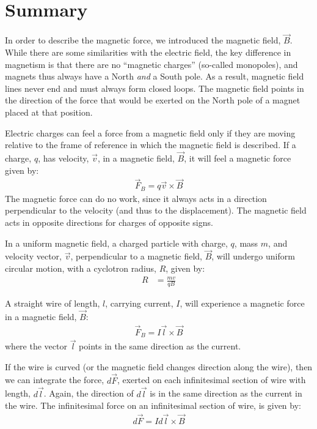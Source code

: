 \newpage
\section{Summary}
\begin{chapterSummary}
In order to describe the magnetic force, we introduced the magnetic field, $\vec B$. While there are some similarities with the electric field, the key difference in magnetism is that there are no ``magnetic charges'' (so-called monopoles), and magnets thus always have a North \textit{and} a South pole. As a result, magnetic field lines never end and must always form closed loops. The magnetic field points in the direction of the force that would be exerted on the North pole of a magnet placed at that position.

Electric charges can feel a force from a magnetic field only if they are moving relative to the frame of reference in which the magnetic field is described. If a charge, $q$, has velocity, $\vec v$, in a magnetic field, $\vec B$, it will feel a magnetic force given by:
\begin{align*}
\vec F_B =q \vec v \times \vec B
\end{align*}
The magnetic force can do no work, since it always acts in a direction perpendicular to the velocity (and thus to the displacement). The magnetic field acts in opposite directions for charges of opposite signs.


In a uniform magnetic field, a charged particle with charge, $q$, mass $m$, and velocity vector, $\vec v$, perpendicular to a magnetic field, $\vec B$, will undergo uniform circular motion, with a cyclotron radius, $R$, given by:
\begin{align*}
R &= \frac{mv}{qB}
\end{align*}

A straight wire of length, $l$, carrying current, $I$, will experience a magnetic force in a magnetic field, $\vec B$:
\begin{align*}
\vec F_B = I \vec l \times \vec B
\end{align*}
where the vector $\vec l$ points in the same direction as the current.

If the wire is curved (or the magnetic field changes direction along the wire), then we can integrate the force, $d\vec F$, exerted on each infinitesimal section of wire with length, $d\vec l$. Again, the direction of $d\vec l$ is in the same direction as the current in the wire. The infinitesimal force on an infinitesimal section of wire, is given by:
\begin{align*}
d\vec F = I d\vec l \times \vec B
\end{align*}


\end{chapterSummary}
